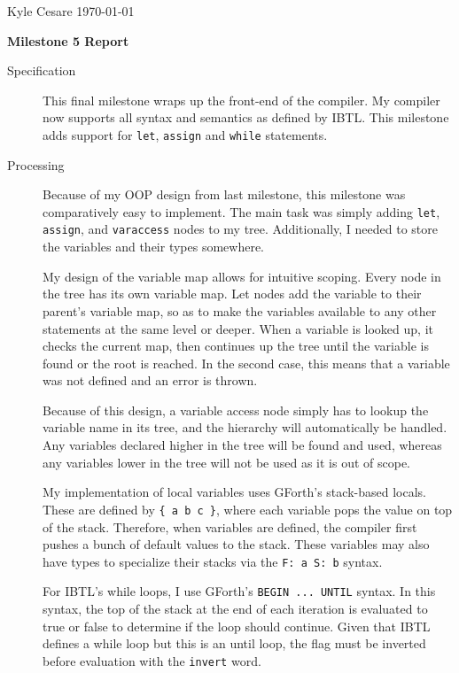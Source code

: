 \documentclass[12pt,letterpaper]{article}
\begin{document}
Kyle Cesare \hfill
\today \hfill

{\center\textbf{Milestone 5 Report} \\}

\begin{description}

\item[Specification] This final milestone wraps up the front-end of the
  compiler. My compiler now supports all syntax and semantics as defined by
  IBTL. This milestone adds support for \texttt{let}, \texttt{assign} and
  \texttt{while} statements.
  
\item[Processing] Because of my OOP design from last milestone, this milestone
  was comparatively easy to implement. The main task was simply adding
  \texttt{let}, \texttt{assign}, and \texttt{varaccess} nodes to my tree.
  Additionally, I needed to store the variables and their types somewhere.

  My design of the variable map allows for intuitive scoping. Every node in the
  tree has its own variable map. Let nodes add the variable to their
  parent's variable map, so as to make the variables available to any other
  statements at the same level or deeper. When a variable is looked up, it
  checks the current map, then continues up the tree until the variable is found
  or the root is reached. In the second case, this means that a variable was not
  defined and an error is thrown.

  Because of this design, a variable access node simply has to lookup the
  variable name in its tree, and the hierarchy will automatically be handled.
  Any variables declared higher in the tree will be found and used, whereas any
  variables lower in the tree will not be used as it is out of scope.

  My implementation of local variables uses GForth's stack-based locals. These
  are defined by \texttt{\{ a b c \}}, where each variable pops the value on top
  of the stack. Therefore, when variables are defined, the compiler first pushes
  a bunch of default values to the stack. These variables may also have types to
  specialize their stacks via the \texttt{F: a S: b} syntax.

  For IBTL's while loops, I use GForth's \texttt{BEGIN ... UNTIL} syntax. In
  this syntax, the top of the stack at the end of each iteration is evaluated to
  true or false to determine if the loop should continue. Given that IBTL
  defines a while loop but this is an until loop, the flag must be inverted
  before evaluation with the \texttt{invert} word.


\end{description}
\end{document}
